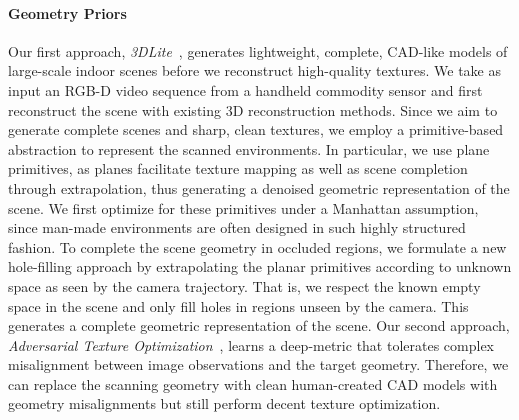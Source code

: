 \paragraph*{Geometry Priors}
Our first approach, \emph{3DLite}~\cite{huang20173dlite}, generates lightweight, complete, CAD-like models of large-scale indoor scenes before we reconstruct high-quality textures.
%
We take as input an RGB-D video sequence from a handheld commodity sensor and first reconstruct the scene with existing 3D reconstruction methods.
Since we aim to generate complete scenes and sharp, clean textures, we employ a primitive-based abstraction to represent the scanned environments.
In particular, we use plane primitives, as planes facilitate texture mapping as well as scene completion through extrapolation, thus generating a denoised geometric representation of the scene.
%
We first optimize for these primitives under a Manhattan assumption, since man-made environments are often designed in such highly structured fashion.
To complete the scene geometry in occluded regions, we formulate a new hole-filling approach by extrapolating the planar primitives according to unknown space as seen by the camera trajectory.
That is, we respect the known empty space in the scene and only fill holes in regions unseen by the camera.
This generates a complete geometric representation of the scene.
%
Our second approach, \emph{Adversarial Texture Optimization}~\cite{huang2020adversarial}, learns a deep-metric that tolerates complex misalignment between image observations and the target geometry. Therefore, we can replace the scanning geometry with clean human-created CAD models with geometry misalignments but still perform decent texture optimization.


